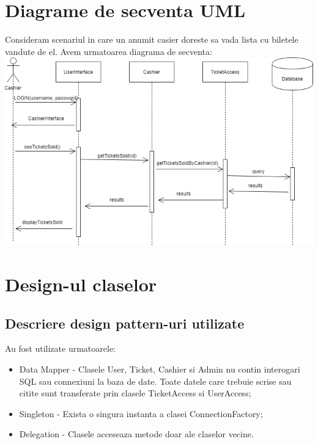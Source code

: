 \documentclass[11pt,a4paper,twoside,notitlepage]{article}
\begin{document}
\section{Diagrame de secventa UML}
Consideram scenariul in care un anumit casier doreste sa vada lista cu biletele vandute de el. Avem urmatoarea diagrama de secventa: \\
\includegraphics[width=.6\textheight]{Sequential}


\section{Design-ul claselor}

\subsection{Descriere design pattern-uri utilizate}

Au fost utilizate urmatoarele:
\begin{itemize}
	\item Data Mapper - Clasele User, Ticket, Cashier si Admin nu contin interogari SQL sau connexiuni la baza de date. Toate datele care trebuie scrise sau citite sunt transferate prin clasele TicketAccess si UserAccess;
	\item Singleton - Exista o singura instanta a clasei ConnectionFactory;
	\item Delegation - Clasele acceseaza metode doar ale claselor vecine.
\end{itemize}

\newpage
\end{document}
